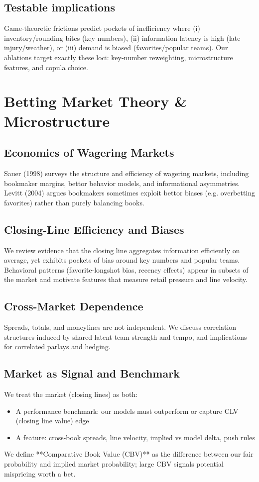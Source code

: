 \subsection{Testable implications}
Game‑theoretic frictions predict pockets of inefficiency where (i) inventory/rounding bites (key numbers), (ii) information latency is high (late injury/weather), or (iii) demand is biased (favorites/popular teams). Our ablations target exactly these loci: key‑number reweighting, microstructure features, and copula choice.

\section{Betting Market Theory \& Microstructure}
\label{sec:market}

\subsection{Economics of Wagering Markets}
Sauer (1998) surveys the structure and efficiency of wagering markets, including bookmaker margins, bettor behavior models, and informational asymmetries. \citep{sauer1998}  
Levitt (2004) argues bookmakers sometimes exploit bettor biases (e.g. overbetting favorites) rather than purely balancing books. \citep{levitt2004}

\subsection{Closing-Line Efficiency and Biases}
We review evidence that the closing line aggregates information efficiently on average, yet exhibits pockets of bias around key numbers and popular teams. Behavioral patterns (favorite-longshot bias, recency effects) appear in subsets of the market and motivate features that measure retail pressure and line velocity.

\subsection{Cross-Market Dependence}
Spreads, totals, and moneylines are not independent. We discuss correlation structures induced by shared latent team strength and tempo, and implications for correlated parlays and hedging.

\subsection{Market as Signal and Benchmark}
We treat the market (closing lines) as both:
\begin{itemize}
  \item A performance benchmark: our models must outperform or capture CLV (closing line value) edge
  \item A feature: cross-book spreads, line velocity, implied vs model delta, push rules
\end{itemize}
We define **Comparative Book Value (CBV)** as the difference between our fair probability and implied market probability; large CBV signals potential mispricing worth a bet.

